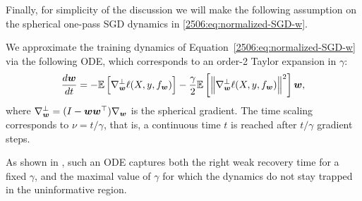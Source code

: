 Finally, for simplicity of the discussion we will make the following assumption on the spherical one-pass SGD dynamics in \cref{2506:eq:normalized-SGD-w}.
\begin{assumption}
    We approximate the training dynamics of Equation~\eqref{2506:eq:normalized-SGD-w} via the following ODE, which corresponds to an order-2 Taylor expansion in $\gamma$:
\begin{equation}\label{2506:eq:ode_approx}
    \frac{d{\boldsymbol{w}}}{dt} = -\mathbb{E}\left[{\nabla_{{\boldsymbol{w}}}^\bot \ell(X, y, f_{{\boldsymbol{w}}})}\right] - \frac{\gamma}2  \mathbb{E}\left[{\left\lVert \nabla_{{\boldsymbol{w}}}^\bot \ell(X, y, f_{{\boldsymbol{w}}})\right\rVert^2}\right] {\boldsymbol{w}},
\end{equation}
where $\nabla_{{\boldsymbol{w}}}^\bot = (I - {\boldsymbol{w}}{\boldsymbol{w}}^\top)\nabla_{{\boldsymbol{w}}}$ is the spherical gradient. The time scaling corresponds to $\nu = t/\gamma$, that is, a continuous time $t$ is reached after $t/\gamma$ gradient steps.
\end{assumption}
 As shown in 
\cite{arous2021online,arnaboldi2024repetita}, such an ODE captures both the right weak recovery time for a fixed $\gamma$, and the maximal value of $\gamma$ for which the dynamics do not stay trapped in the uninformative region.
